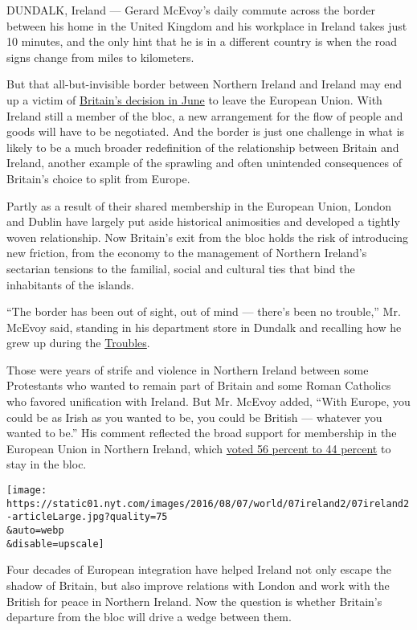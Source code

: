 DUNDALK, Ireland --- Gerard McEvoy's daily commute across the border
between his home in the United Kingdom and his workplace in Ireland
takes just 10 minutes, and the only hint that he is in a different
country is when the road signs change from miles to kilometers.

But that all-but-invisible border between Northern Ireland and Ireland
may end up a victim of
\href{http://www.nytimes.com/news-event/britain-brexit-european-union?8qa}{Britain's
decision in June} to leave the European Union. With Ireland still a
member of the bloc, a new arrangement for the flow of people and goods
will have to be negotiated. And the border is just one challenge in what
is likely to be a much broader redefinition of the relationship between
Britain and Ireland, another example of the sprawling and often
unintended consequences of Britain's choice to split from Europe.

Partly as a result of their shared membership in the European Union,
London and Dublin have largely put aside historical animosities and
developed a tightly woven relationship. Now Britain's exit from the bloc
holds the risk of introducing new friction, from the economy to the
management of Northern Ireland's sectarian tensions to the familial,
social and cultural ties that bind the inhabitants of the islands.

``The border has been out of sight, out of mind --- there's been no
trouble,'' Mr. McEvoy said, standing in his department store in Dundalk
and recalling how he grew up during the
\href{http://www.bbc.co.uk/history/troubles}{Troubles}.

Those were years of strife and violence in Northern Ireland between some
Protestants who wanted to remain part of Britain and some Roman
Catholics who favored unification with Ireland. But Mr. McEvoy added,
``With Europe, you could be as Irish as you wanted to be, you could be
British --- whatever you wanted to be.'' His comment reflected the broad
support for membership in the European Union in Northern Ireland, which
\href{http://www.nytimes.com/interactive/2016/06/24/world/europe/how-britain-voted-brexit-referendum.html}{voted
56 percent to 44 percent} to stay in the bloc.

\texttt{[image: https://static01.nyt.com/images/2016/08/07/world/07ireland2/07ireland2-articleLarge.jpg?quality=75\\\&auto=webp\\\&disable=upscale]}

Four decades of European integration have helped Ireland not only escape
the shadow of Britain, but also improve relations with London and work
with the British for peace in Northern Ireland. Now the question is
whether Britain's departure from the bloc will drive a wedge between
them.

